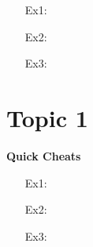 \documentclass[12pt]{amsart}
\theoremstyle{plain}
\theoremstyle{definition}
\begin{document}
\begin{enumerate}
\setlength{\itemsep}{200pt}
\item[Ex1:]                 
\item[Ex2:]                 
\item[Ex3:] 
\item[]
\end{enumerate}

\section*{Topic 1}             

\begin{mdframed}[style=MyFrame]
\begin{center}               
\textbf{Quick Cheats}          
\end{center}                   

\end{mdframed}

\begin{enumerate}
\setlength{\itemsep}{200pt}
\item[Ex1:]                 
\item[Ex2:]                 
\item[Ex3:] 
\item[]
\end{enumerate}
\end{document}
